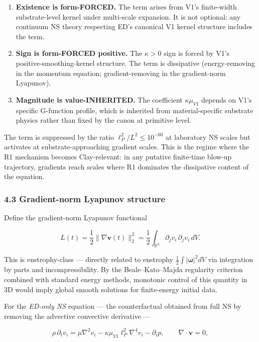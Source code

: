 \documentclass[
]{article}
\begin{document}
\begin{enumerate}
\def\labelenumi{\arabic{enumi}.}
\item
  \textbf{Existence is form-FORCED.} The term arises from V1's
  finite-width substrate-level kernel under multi-scale expansion. It is
  not optional: any continuum NS theory respecting ED's canonical V1
  kernel structure includes the term.
\item
  \textbf{Sign is form-FORCED positive.} The \(\kappa > 0\) sign is
  forced by V1's positive-smoothing-kernel structure. The term is
  dissipative (energy-removing in the momentum equation;
  gradient-removing in the gradient-norm Lyapunov).
\item
  \textbf{Magnitude is value-INHERITED.} The coefficient
  \(\kappa \mu_{V1}\) depends on V1's specific G-function profile, which
  is inherited from material-specific substrate physics rather than
  fixed by the canon at primitive level.
\end{enumerate}

The term is suppressed by the ratio \(\ell_P^2 / L^2 \le 10^{-60}\) at
laboratory NS scales but activates at substrate-approaching gradient
scales. This is the regime where the R1 mechanism becomes Clay-relevant:
in any putative finite-time blow-up trajectory, gradients reach scales
where R1 dominates the dissipative content of the equation.

\subsubsection{4.3 Gradient-norm Lyapunov
structure}\label{gradient-norm-lyapunov-structure}

Define the gradient-norm Lyapunov functional

\[L(t) = \frac{1}{2} \|\nabla \mathbf{v}(t)\|_2^2 = \frac{1}{2} \int_{\mathbb{R}^3} \partial_j v_i \, \partial_j v_i \, dV.\]

This is enstrophy-class --- directly related to enstrophy
\(\frac{1}{2}\int|\boldsymbol{\omega}|^2 dV\) via integration by parts
and incompressibility. By the Beale--Kato--Majda regularity criterion
combined with standard energy methods, monotonic control of this
quantity in 3D would imply global smooth solutions for finite-energy
initial data.

For the \emph{ED-only NS} equation --- the counterfactual obtained from
full NS by removing the advective convective derivative ---

\[\rho\,\partial_t v_i = \mu\nabla^2 v_i - \kappa\mu_{V1}\ell_P^2\nabla^4 v_i - \partial_i p, \qquad \nabla\cdot\mathbf{v} = 0,\]
\end{document}
